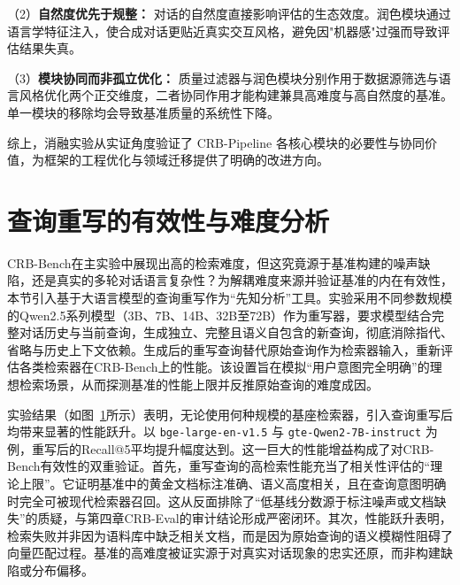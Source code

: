 （2）\textbf{自然度优先于规整：} 对话的自然度直接影响评估的生态效度。润色模块通过语言学特征注入，使合成对话更贴近真实交互风格，避免因"机器感"过强而导致评估结果失真。

（3）\textbf{模块协同而非孤立优化：} 质量过滤器与润色模块分别作用于数据源筛选与语言风格优化两个正交维度，二者协同作用才能构建兼具高难度与高自然度的基准。单一模块的移除均会导致基准质量的系统性下降。


综上，消融实验从实证角度验证了 CRB-Pipeline 各核心模块的必要性与协同价值，为框架的工程优化与领域迁移提供了明确的改进方向。


\section{查询重写的有效性与难度分析}
\label{sec:query_rewriting_analysis}

CRB-Bench在主实验中展现出高的检索难度，但这究竟源于基准构建的噪声缺陷，还是真实的多轮对话语言复杂性？为解耦难度来源并验证基准的内在有效性，本节引入基于大语言模型的查询重写作为“先知分析”工具。实验采用不同参数规模的Qwen2.5系列模型（3B、7B、14B、32B至72B）作为重写器，要求模型结合完整对话历史与当前查询，生成独立、完整且语义自包含的新查询，彻底消除指代、省略与历史上下文依赖。生成后的重写查询替代原始查询作为检索器输入，重新评估各类检索器在CRB-Bench上的性能。该设置旨在模拟“用户意图完全明确”的理想检索场景，从而探测基准的性能上限并反推原始查询的难度成因。

实验结果（如图~\ref{fig:rewriting_performance}所示）表明，无论使用何种规模的基座检索器，引入查询重写后均带来显著的性能跃升。以 \texttt{bge-large-en-v1.5} 与 \texttt{gte-Qwen2-7B-instruct} 为例，重写后的Recall@5平均提升幅度达到。这一巨大的性能增益构成了对CRB-Bench有效性的双重验证。首先，重写查询的高检索性能充当了相关性评估的“理论上限”。它证明基准中的黄金文档标注准确、语义高度相关，且在查询意图明确时完全可被现代检索器召回。这从反面排除了“低基线分数源于标注噪声或文档缺失”的质疑，与第四章CRB-Eval的审计结论形成严密闭环。其次，性能跃升表明，检索失败并非因为语料库中缺乏相关文档，而是因为原始查询的语义模糊性阻碍了向量匹配过程。基准的高难度被证实源于对真实对话现象的忠实还原，而非构建缺陷或分布偏移。

\begin{figure}[t]
    \centering
    \label{fig:rewriting_performance}
\end{figure}

